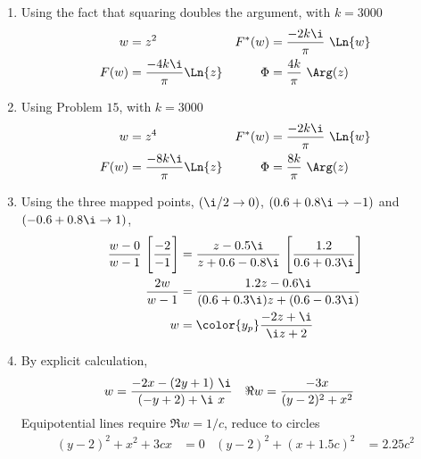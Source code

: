 \begin{enumerate}
    \item Using the fact that squaring doubles the argument, with $ k = 3000 $
          \begin{align}
              w      & = z^2                       &
              F^*(w) & = \frac{-2k\i}{\pi}\ \Ln{w}   \\
              F(w)   & = \frac{-4k\i}{\pi} \Ln{z}  &
              \Phi   & = \frac{4k}{\pi}\ \Arg(z)
          \end{align}

    \item Using Problem $ 15 $, with $ k = 3000 $
          \begin{align}
              w      & = z^4                       &
              F^*(w) & = \frac{-2k\i}{\pi}\ \Ln{w}   \\
              F(w)   & = \frac{-8k\i}{\pi} \Ln{z}  &
              \Phi   & = \frac{8k}{\pi}\ \Arg(z)
          \end{align}

    \item Using the three mapped points, $ (\i/2 \to 0) $, $ (0.6 + 0.8\i \to -1) $
          and $ (-0.6 + 0.8\i \to 1) $,
          \begin{align}
              \frac{w - 0}{w - 1}\ \Bigg[ \frac{-2}{-1} \Bigg] & =
              \frac{z - 0.5\i}{z + 0.6 - 0.8\i}\ \Bigg[ \frac{1.2}{0.6 + 0.3\i}
              \Bigg]                                                           \\
              \frac{2w}{w-1}                                   & =
              \frac{1.2z - 0.6\i}{(0.6 + 0.3\i)z + (0.6 - 0.3\i)}              \\
              w                                                & = \color{y_p}
              \frac{-2z + \i}{\i z + 2}
          \end{align}

    \item By explicit calculation,
          \begin{align}
              w      & = \frac{-2x - (2y + 1)\ \i}{(-y+2) + \i\ x} &
              \Re{w} & = \frac{-3x}{(y-2)^2 + x^2}
          \end{align}
          Equipotential lines require $ \Re{w} = 1/c $, reduce to circles
          \begin{align}
              (y-2)^2 + x^2 + 3cx    & = 0       &
              (y-2)^2 + (x + 1.5c)^2 & = 2.25c^2
          \end{align}


\end{enumerate}
